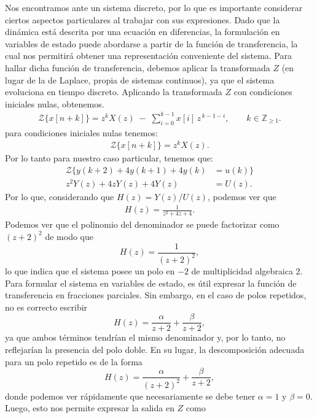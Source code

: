 \documentclass[
  11pt,
  letterpaper,
   addpoints,
  answers
  ]{exam}
\begin{document}
\begin{questions}
\begin{solution}
Nos encontramos ante un sistema discreto, por lo que es importante considerar ciertos aspectos particulares al trabajar con sus expresiones. Dado que la dinámica está descrita por una ecuación en diferencias, la formulación en variables de estado puede abordarse a partir de la función de transferencia, la cual nos permitirá obtener una representación conveniente del sistema. Para hallar dicha función de transferencia, debemos aplicar la transformada $Z$ (en lugar de la de Laplace, propia de sistemas continuos), ya que el sistema evoluciona en tiempo discreto. Aplicando la transformada $Z$ con condiciones iniciales nulas, obtenemos.
\begin{align}
  \mathcal{Z}\{x[n+k]\}
= z^{k} X(z) \;-\; \sum_{i=0}^{k-1} x[i]\, z^{\,k-1-i},
\qquad k\in \mathbb{Z}_{\ge 1}.
\end{align}
para condiciones iniciales nulas tenemos:
\begin{align}
  \mathcal{Z}\{x[n+k]\}
= z^{k} X(z).
\end{align}
Por lo tanto para nuestro caso particular, tenemos que:
\begin{align}
  \mathcal{Z}\{y(k+2) + 4y(k+1) + 4y(k) &= u(k)\} \\
z^{2}Y(z)+4zY(z)+4Y(z)&=U(z).
\end{align}
Por lo que, considerando que $H(z)=Y(z)/U(z)$, podemos ver que
\begin{align}
H(z)=\frac{1}{z^{2}+4z+4}.
\end{align}
Podemos ver que el polinomio del denominador se puede factorizar como $(z+2)^{2}$ de modo que
\begin{equation}
H(z)=\frac{1}{(z+2)^{2}},
\end{equation}
lo que indica que el sistema posee un polo en $-2$ de multiplicidad algebraica $2$. Para formular el sistema en variables de estado, es útil expresar la función de transferencia en fracciones parciales. Sin embargo, en el caso de polos repetidos, no es correcto escribir
\begin{equation}
H(z)=\frac{\alpha}{z+2}+\frac{\beta}{z+2},
\end{equation}
ya que ambos términos tendrían el mismo denominador y, por lo tanto, no reflejarían la presencia del polo doble. En su lugar, la descomposición adecuada para un polo repetido es de la forma
\begin{equation}
H(z)=\frac{\alpha}{(z+2)^{2}}+\frac{\beta}{z+2},
\end{equation}
donde podemos ver rápidamente que necesariamente se debe tener $\alpha=1$ y $\beta=0$. Luego, esto nos permite expresar la salida en $Z$ como

\end{solution}
\end{questions}
\end{document}
